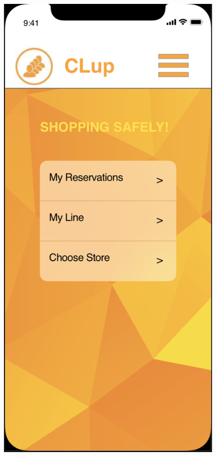 \documentclass{article}
\begin{document}
\begin{figure}[H]
\begin{minipage}[b]{0.4\textwidth}
\centering
\includegraphics[width=\textwidth]{home.png}

\end{minipage}
\end{figure}
\end{document}
